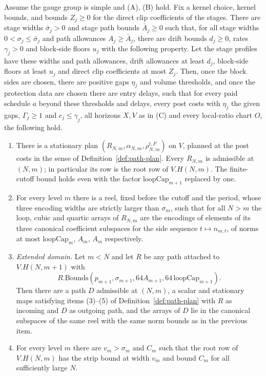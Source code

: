 \begin{proposition}
\label{prop:path-retained-plan}
Assume the gauge group is simple and \textup{(A)}, \textup{(B)} hold.
Fix a kernel choice, kernel bounds, and bounds $Z_j\ge0$ for the
direct clip coefficients of the stages. There are stage widths
$\bar\sigma_j>0$ and stage path bounds $\bar A_j\ge0$ such that, for
all stage widths $0<\sigma_j\le\bar\sigma_j$ and path allowances
$A_j\ge\bar A_j$, there are drift bounds $d_j\ge0$, rates
$\gamma_j>0$ and block-side floors $u_j$ with the following property.
Let the stage profiles have these widths and path allowances, drift
allowances at least $d_j$, block-side floors at least $u_j$ and direct
clip coefficients at most $Z_j$. Then, once the block sides
are chosen, there are positive gaps $\eta_j$ and volume thresholds, and
once the protection data are chosen there are entry delays, such that
for every paid schedule $a$ beyond these thresholds and delays, every
post costs with $\eta_j$ the given gaps, $\Gamma_j\ge1$ and
$c_j\le\gamma_j$, all horizons $X,V$ as in \textup{(C)} and every
local-ratio chart $O$, the following hold.
\begin{enumerate}
\item There is a stationary plan $(R_{N,m},\alpha_{N,m},\rho_{N,m}^{t,F})$
 on $V$, planned at the post costs in the sense of
 Definition~\ref{def:path-plan}. Every $R_{N,m}$ is admissible at
 $(N,m)$; in particular its row is the root row of $V.H(N,m)$. The
 finite-cutoff bound holds even with the factor $\mathrm{loopCap}_{m+1}$
 replaced by one.
\item For every level $m$ there is a reel, fixed before the cutoff and
 the period, whose three encoding widths are strictly larger than
 $\sigma_m$, such that for all $N>m$ the loop, cubic and quartic arrays
 of $R_{N,m}$ are the encodings of elements of its three canonical
 coefficient subspaces for the side sequence $t\mapsto n_{m,t}$, of
 norms at most $\mathrm{loopCap}_m$, $A_m$, $A_m$ respectively.
\item \emph{Extended domain.} Let $m<N$ and let $R$ be any path
 attached to $V.H(N,m+1)$ with
 \[
 R.\mathrm{Bounds}(p_{m+1},\sigma_{m+1},64A_{m+1},
 64\,\mathrm{loopCap}_{m+1}).
 \]
 Then there are a path $D$ admissible at
 $(N,m)$, a scalar and stationary maps satisfying items \textup{(3)--(5)}
 of Definition~\ref{def:path-plan} with $R$ as incoming and $D$ as
 outgoing path, and the arrays of $D$ lie in the canonical subspaces of
 the same reel with the same norm bounds as in the previous item.
\item For every level $m$ there are $v_m>\sigma_m$ and $C_m$ such that
 the root row of $V.H(N,m)$ has the strip bound at width $v_m$ and
 bound $C_m$ for all sufficiently large $N$.
\end{enumerate}
\end{proposition}
